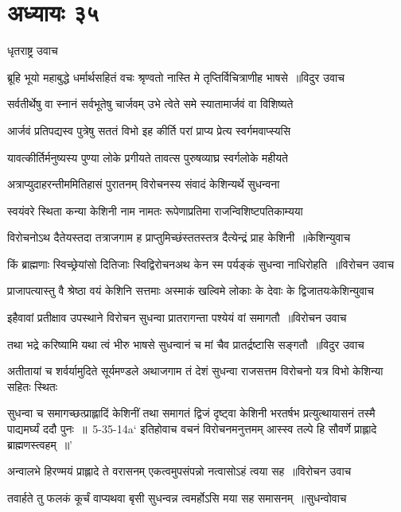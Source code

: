 \chapter{अध्यायः ३५}
\twolineshloka
{धृतराष्ट्र उवाच}
{}


\threelineshloka
{ब्रूहि भूयो महाबुद्धे धर्मार्थसहितं वचः}
{श्रृण्वतो नास्ति मे तृप्तिर्विचित्राणीह भाषसे ॥विदुर उवाच}
{}


\threelineshloka
{सर्वतीर्थेषु वा स्नानं सर्वभूतेषु चार्जवम्}
{उभे त्वेते समे स्यातामार्जवं वा विशिष्यते}
{}


\twolineshloka
{आर्जवं प्रतिपद्यस्व पुत्रेषु सततं विभो}
{इह कीर्ति परां प्राप्य प्रेत्य स्वर्गमवाप्स्यसि}


\twolineshloka
{यावत्कीर्तिर्मनुष्यस्य पुण्या लोके प्रगीयते}
{तावत्स पुरुषव्याघ्र स्वर्गलोके महीयते}


\twolineshloka
{अत्राप्युदाहरन्तीममितिहासं पुरातनम्}
{विरोचनस्य संवादं केशिन्यर्थे सुधन्वना}


\twolineshloka
{स्वयंवरे स्थिता कन्या केशिनी नाम नामतः}
{रूपेणाप्रतिमा राजन्विशिष्टपतिकाम्यया}


\threelineshloka
{विरोचनोऽथ दैतेयस्तदा तत्राजगाम ह}
{प्राप्तुमिच्छंस्ततस्तत्र दैत्येन्द्रं प्राह केशिनी ॥केशिन्युवाच}
{}


\twolineshloka
{किं ब्राह्मणाः स्विच्छ्रेयांसो दितिजाः स्विद्विरोचनअथ केन स्म पर्यङ्कं सुधन्वा नाधिरोहति ॥विरोचन उवाच}
{}


\threelineshloka
{प्राजापत्यास्तु वै श्रेष्ठा वयं केशिनि सत्तमाः}
{अस्माकं खल्विमे लोकाः के देवाः के द्विजातयःकेशिन्युवाच}
{}


\threelineshloka
{इहैवावां प्रतीक्षाव उपस्थाने विरोचन}
{सुधन्वा प्रातरागन्ता पश्येयं वां समागतौ ॥विरोचन उवाच}
{}


\threelineshloka
{तथा भद्रे करिष्यामि यथा त्वं भीरु भाषसे}
{सुधन्वानं च मां चैव प्रातर्द्रष्टासि सङ्गतौ ॥विदुर उवाच}
{}


\threelineshloka
{अतीतायां च शर्वर्यामुदिते सूर्यमण्डले}
{अथाजगाम तं देशं सुधन्वा राजसत्तम}
{विरोचनो यत्र विभो केशिन्या सहितः स्थितः}


\fourlineindentedshloka
{सुधन्वा च समागच्छत्प्राह्लादिं केशिनीं तथा}
{समागतं द्विजं दृष्ट्वा केशिनी भरतर्षभ}
{प्रत्युत्थायासनं तस्मै पाद्यमर्घ्यं ददौ पुनः ॥ 5-35-14a` इतिहोवाच वचनं विरोचनमनुत्तमम्}
{आस्स्व तल्पे हि सौवर्णे प्राह्लादे ब्राह्मणस्त्वहम् ॥'}


\threelineshloka
{अन्वालभे हिरण्मयं प्राह्लादे ते वरासनम्}
{एकत्वमुपसंपन्नो नत्वासोऽहं त्वया सह ॥विरोचन उवाच}
{}


\threelineshloka
{तवार्हते तु फलकं कूर्चं वाप्यथवा बृसी}
{सुधन्वन्न त्वमर्होऽसि मया सह समासनम् ॥सुधन्वोवाच}
{}


